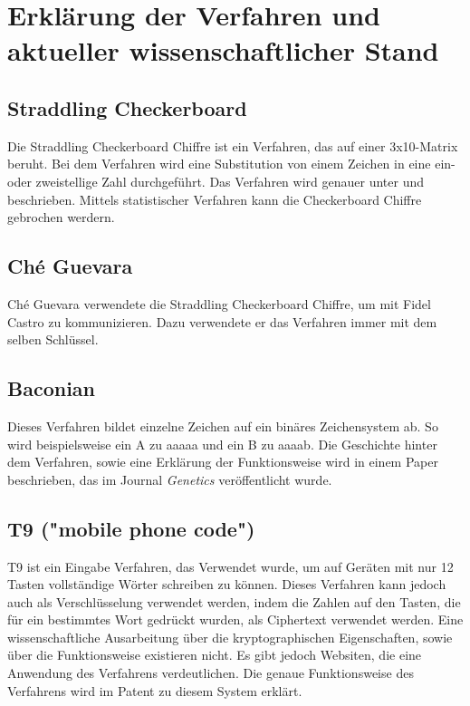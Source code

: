 \documentclass[fontsize=11pt, paper=a4, parskip=half]{scrartcl}
\begin{document}
\section{Erklärung der Verfahren und aktueller wissenschaftlicher Stand}
\subsection{Straddling Checkerboard}
Die Straddling Checkerboard Chiffre ist ein Verfahren, das auf einer 3x10-Matrix beruht. Bei dem Verfahren wird eine Substitution von einem Zeichen in eine ein- oder zweistellige Zahl durchgeführt. Das Verfahren wird genauer unter \cite{Kuhlemann2020SpionageChiffreStraddlingCheckerboard} und \cite{Goebel2020TheRiseOfFieldCiphers} beschrieben. Mittels statistischer Verfahren kann die Checkerboard Chiffre gebrochen werdern. \cite{Lyons2012CryptanalysisOfTheSimpleSubstitutionCipher}
\subsection{Ché Guevara}
Ché Guevara verwendete die Straddling Checkerboard Chiffre, um mit Fidel Castro zu kommunizieren. Dazu verwendete er das Verfahren immer mit dem selben Schlüssel. \cite{Kuhlemann2020CheGuevaraChiffre}
\subsection{Baconian}
Dieses Verfahren bildet einzelne Zeichen auf ein binäres Zeichensystem ab. So wird beispielsweise ein A zu aaaaa und ein B zu aaaab. Die Geschichte hinter dem Verfahren, sowie eine Erklärung der Funktionsweise wird in einem Paper beschrieben, das im Journal \textit{Genetics} veröffentlicht wurde.
\cite{Goldman2017WilliamFriedmanGeneticistTurnedCryptographer}
\subsection{T9 ("mobile phone code")}
T9 ist ein Eingabe Verfahren, das Verwendet wurde, um auf Geräten mit nur 12 Tasten vollständige Wörter schreiben zu können. Dieses Verfahren kann jedoch auch als Verschlüsselung verwendet werden, indem die Zahlen auf den Tasten, die für ein bestimmtes Wort gedrückt wurden, als Ciphertext verwendet werden. Eine wissenschaftliche Ausarbeitung über die kryptographischen Eigenschaften, sowie über die Funktionsweise existieren nicht. Es gibt jedoch Websiten, die eine Anwendung des Verfahrens verdeutlichen. \cite{unknown2020T9TextMessage} Die genaue Funktionsweise des Verfahrens wird im Patent zu diesem System erklärt. \cite{groverKingKushler1998ReducedKeyboardDisambiguatingComputer}
\end{document}

